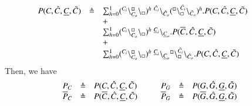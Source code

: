 \[
\begin{array}{lcl @{\hspace{1cm}}lcl}
P(C,\hat{C},\underline{C},\tilde{C}) & \defeq &  \sum_{h=0}^1 (\startchain{C_i}\chainedlink{C_o}{\noact}\chainend{\noact})^h\ \link{\hat{C}_i}{\hat{C}_o} (\startchain{\noact}\chainedlink{\noact}{\tilde{C}_i}\chainend{\tilde{C}_o})^h.   P(C,\hat{C},\underline{C},\tilde{C})\\
&&+\\
&& \sum_{h=0}^1 (\startchain{C_i}\chainedlink{C_o}{\noact}\chainend{\noact})^h\ \link{\underline{C}_i}{\underline{C}_o}.P(\overline{C},\hat{C},\underline{C},\tilde{C})\\
&&+\\
 && \sum_{h=0}^1 (\startchain{C_i}\chainedlink{C_o}{\noact}\chainend{\noact})^h\ \link{\underline{C}_i}{\underline{C}_o} \startchain{\noact}\chainedlink{\noact}{\hat{C}_i}\chainend{\hat{C}_o}.   P(C,\hat{C},\underline{C},\tilde{C}) \\
\end{array}
\]
Then, we have
\[
\begin{array}{lcl @{\hspace{1cm}}lcl@{\hspace{0.4cm}}lcl@{\hspace{0.4cm}}lcl}
P_C & \defeq &  P(C,\hat{C},\underline{C},\tilde{C})&  P_G& \defeq &   P(G,\hat{G},\underline{G},\tilde{G}) \\
\overline{P}_C & \defeq &  P(\overline{C},\hat{C},\underline{C},\tilde{C}) & 
\overline{P}_G& \defeq &   P(\overline{G},\hat{G},\underline{G},\tilde{G})\\
\end{array}
\]

